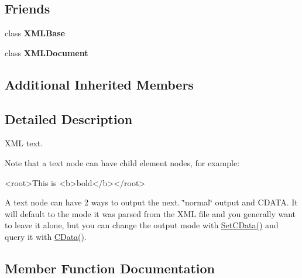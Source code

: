 \subsection*{Friends}
\begin{DoxyCompactItemize}
\item 
class {\bfseries X\+M\+L\+Base}\hypertarget{classtinyxml2_1_1_x_m_l_text_a449202cfc89e7ae5c2f81995476f9ec1}{}\label{classtinyxml2_1_1_x_m_l_text_a449202cfc89e7ae5c2f81995476f9ec1}

\item 
class {\bfseries X\+M\+L\+Document}\hypertarget{classtinyxml2_1_1_x_m_l_text_a4eee3bda60c60a30e4e8cd4ea91c4c6e}{}\label{classtinyxml2_1_1_x_m_l_text_a4eee3bda60c60a30e4e8cd4ea91c4c6e}

\end{DoxyCompactItemize}
\subsection*{Additional Inherited Members}


\subsection{Detailed Description}
X\+ML text.

Note that a text node can have child element nodes, for example\+: \begin{DoxyVerb}<root>This is <b>bold</b></root>
\end{DoxyVerb}


A text node can have 2 ways to output the next. \char`\"{}normal\char`\"{} output and C\+D\+A\+TA. It will default to the mode it was parsed from the X\+ML file and you generally want to leave it alone, but you can change the output mode with \hyperlink{classtinyxml2_1_1_x_m_l_text_ad080357d76ab7cc59d7651249949329d}{Set\+C\+Data()} and query it with \hyperlink{classtinyxml2_1_1_x_m_l_text_a125574fe49da80efbae1349f20d02d41}{C\+Data()}. 

\subsection{Member Function Documentation}
